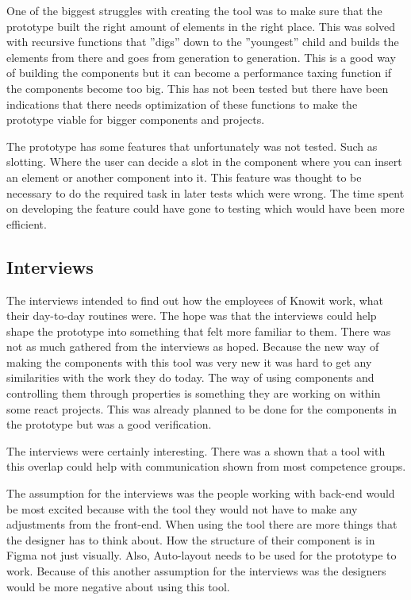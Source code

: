 One of the biggest struggles with creating the tool was to make sure that the prototype built the right amount of elements in the right place. This was solved with recursive functions that ''digs'' down to the ''youngest'' child and builds the elements from there and goes from generation to generation. This is a good way of building the components but it can become a performance taxing function if the components become too big. This has not been tested but there have been indications that there needs optimization of these functions to make the prototype viable for bigger components and projects.

The prototype has some features that unfortunately was not tested. Such as slotting. Where the user can decide a slot in the component where you can insert an element or another component into it. This feature was thought to be necessary to do the required task in later tests which were wrong. The time spent on developing the feature could have gone to testing which would have been more efficient.


\subsection{Interviews}%
\label{sub:Interviews}

The interviews intended to find out how the employees of Knowit work, what their day-to-day routines were. The hope was that the interviews could help shape the prototype into something that felt more familiar to them. There was not as much gathered from the interviews as hoped. Because the new way of making the components with this tool was very new it was hard to get any similarities with the work they do today. The way of using components and controlling them through properties is something they are working on within some react projects. This was already planned to be done for the components in the prototype but was a good verification.

The interviews were certainly interesting. There was a shown that a tool with this overlap could help with communication shown from most competence groups.

The assumption for the interviews was the people working with back-end would be most excited because with the tool they would not have to make any adjustments from the front-end. When using the tool there are more things that the designer has to think about. How the structure of their component is in Figma not just visually. Also, Auto-layout needs to be used for the prototype to work. Because of this another assumption for the interviews was the designers would be more negative about using this tool. 

